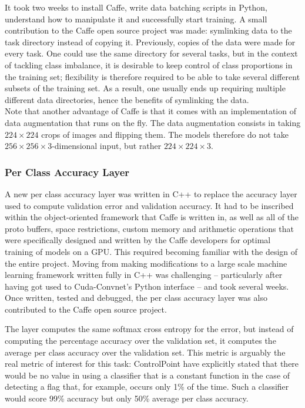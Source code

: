 \documentclass[a4paper,11pt]{article}
\begin{document}
It took two weeks to install Caffe, write data batching scripts in Python, understand how to manipulate it and successfully start training. A small contribution to the Caffe open source project was made: symlinking data to the task directory instead of copying it. Previously, copies of the data were made for every task. One could use the same directory for several tasks, but in the context of tackling class imbalance, it is desirable to keep control of class proportions in the training set; flexibility is therefore required to be able to take several different subsets of the training set. As a result, one usually ends up requiring multiple different data directories, hence the benefits of symlinking the data. \\

Note that another advantage of Caffe is that it comes with an implementation of data augmentation that runs on the fly. The data augmentation consists in taking $224\times224$ crops of images and flipping them. The models therefore do not take $256\times256\times3$-dimensional input, but rather $224\times224\times3$.\\


\subsubsection{Per Class Accuracy Layer}

A new per class accuracy layer was written in C++ to replace the accuracy layer used to compute validation error and validation accuracy. It had to be inscribed within the object-oriented framework that Caffe is written in, as well as all of the proto buffers, space restrictions, custom memory and arithmetic operations that were specifically designed and written by the Caffe developers for optimal training of models on a GPU. This required becoming familiar with the design of the entire project. Moving from making modifications to a large scale machine learning framework written fully in C++ was challenging -- particularly after having got used to Cuda-Convnet's Python interface -- and took several weeks. Once written, tested and debugged, the per class accuracy layer was also contributed to the Caffe open source project. 

The layer computes the same softmax cross entropy for the error, but instead of computing the percentage accuracy over the validation set, it computes the average per class accuracy over the validation set. This metric is arguably the real metric of interest for this task: ControlPoint have explicitly stated that there would be no value in using a classifier that is a constant function in the case of detecting a flag that, for example, occurs only 1\% of the time. Such a classifier would score 99\% accuracy but only 50\% average per class accuracy.
\end{document}
